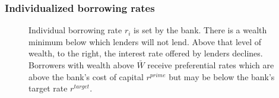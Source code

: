 {%

\subsubsection{Individualized borrowing rates} \label{sec:borowing-rate}

    \begin{figure}
    \centering
    \label{fig-capital-cost}
    \caption[Individual borrowing rate $r_i$]{Individual borrowing rate $r_i$ is set by the bank. There is a wealth minimum below which lenders will not lend. Above that level of wealth, to the right, the interest rate offered by lenders declines. Borrowers with wealth above $\bar W$ receive preferential rates which are above the bank's cost of capital $r^{prime}$ but may be below the bank's target rate $r^{target}$.}
    \label{fig:Wealth-based}
    \end{figure}

}
